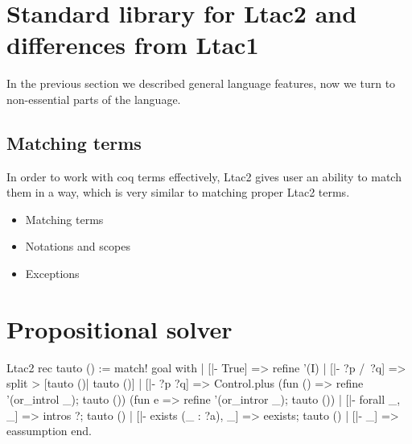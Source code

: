 \section{Standard library for Ltac2 and differences from Ltac1}

In the previous section we described general language features, now we turn to non-essential parts of the language.

\subsection{Matching terms}
\label{sec:matching-terms}

In order to work with coq terms effectively, Ltac2 gives user an ability to match them in a way, which is very similar to matching proper Ltac2 terms.

\begin{itemize}
  \item Matching terms
  
  \item Notations and scopes
  \item Exceptions
\end{itemize}

\section{Propositional solver}
\label{sec:propositional-solver}

\begin{coq}
Ltac2 rec tauto () :=
  match! goal with
  | [|- True] =>
    refine '(I)
  | [|- ?p /\ ?q] =>
    split > [tauto ()| tauto ()]
  | [|- ?p \/ ?q] =>
    Control.plus (fun () => refine '(or_introl _); tauto ())
                 (fun e => refine '(or_intror _); tauto ())
  | [|- forall _, _] =>
    intros ?; tauto ()
  | [|- exists (_ : ?a), _] =>
    eexists; tauto ()
  | [|- _] => eassumption
  end.
\end{coq}

